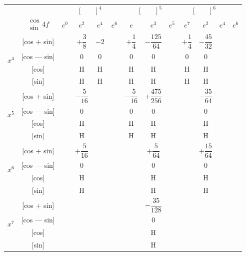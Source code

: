 \documentclass[11pt,a4paper]{book}
\begin{document}
{{\begin{center}
\small
\begin{tabular}{|c|c|c|c|c|c|c|c|c|c|c|c|}
\hline
& &  &  &  \\
& $\begin{smallmatrix} \cos \\ \sin \end{smallmatrix} 4f$ & $e^0$ & $e^2$ & $e^4$ & $e^6$ & $e$ & $e^3$ & $e^5$ & $e^7$ & $e^2$ & $e^4$ & $e^6$ \\
\hline
{} & [cos + sin] & & $+\dfrac{3}{8}$ & $-2$ & & $+\dfrac{1}{4}$ & $-\dfrac{125}{64}$ & & $+\dfrac{1}{4}$ & $-\dfrac{45}{32}$ \\
& [cos --- sin] & & $0$ & $0$ & & $0$ & $0$ & & $0$ & $0$ \\
& [cos] & & H & H & & H & H & & H & H \\
& [sin] & & H & H & & H & H & & H & H \\
\hline
{} & [cos + sin] & & $-\dfrac{5}{16}$ & & & $-\dfrac{5}{16}$ & $+\dfrac{475}{256}$ & & & $-\dfrac{35}{64}$ \\
& [cos --- sin] & & $0$ & & & $0$ & $0$ & & & $0$ \\
& [cos] & & H & & & H & H & & & H \\
& [sin] & & H & & & H & H & & & H \\
\hline
{} & [cos + sin] & & $+\dfrac{5}{16}$ & & & & $+\dfrac{5}{64}$ & & & $+\dfrac{15}{64}$ \\
& [cos --- sin] & & $0$ & & & & $0$ & & & $0$ \\
& [cos] & & H & & & & H & & & H \\
& [sin] & & H & & & & H & & & H \\
\hline
{} & [cos + sin] & & & & & & $-\dfrac{35}{128}$ & & \\
& [cos --- sin] & & & & & & $0$ & & \\
& [cos] & & & & & & H & & \\
& [sin] & & & & & & H & & \\
\hline
\end{tabular}
\end{center}

\newpage
{}

}}
\end{document}
